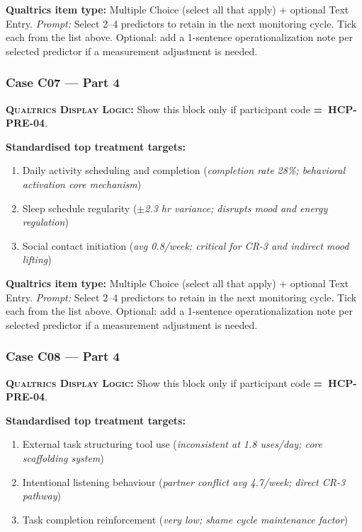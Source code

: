 \documentclass[11pt,a4paper]{article}
\newcommand{\checkboxresponse}[1]{\begin{tcolorbox}[colback=ResponseBG,colframe=GoldAmber,boxrule=0.6pt,arc=1.5mm,left=6pt,right=6pt,top=5pt,bottom=5pt]\small\textbf{\color{GoldAmber}Qualtrics item type:} Multiple Choice (select all that apply) + optional Text Entry. \quad \textit{Prompt:} #1\end{tcolorbox}}
\newcommand{\dlnote}[1]{\par\vspace{0.15em}\noindent\begin{tcolorbox}[colback=AccentAmber,colframe=GoldAmber,boxrule=0.45pt,arc=1mm,left=5pt,right=5pt,top=2.5pt,bottom=2.5pt]\footnotesize\textbf{\color{GoldAmber}\scshape Qualtrics Display Logic:} Show this block only if participant code \textbf{=~#1}.\end{tcolorbox}\vspace{0.1em}}
\begin{document}
\checkboxresponse{Select 2--4 predictors to retain in the next monitoring cycle. Tick each from the list above. Optional: add a 1-sentence operationalization note per selected predictor if a measurement adjustment is needed.}

\vspace{0.4em}

\subsubsection*{Case C07 --- Part 4}
\dlnote{HCP-PRE-04}

\begin{contextbox}
\small\textbf{Standardised top treatment targets:}
\begin{enumerate}[topsep=2pt,itemsep=1pt,label=\arabic*.]
\item Daily activity scheduling and completion (\textit{completion rate 28\%; behavioral activation core mechanism})
\item Sleep schedule regularity (\textit{$\pm$2.3 hr variance; disrupts mood and energy regulation})
\item Social contact initiation (\textit{avg 0.8/week; critical for CR-3 and indirect mood lifting})
\end{enumerate}
\end{contextbox}

\checkboxresponse{Select 2--4 predictors to retain in the next monitoring cycle. Tick each from the list above. Optional: add a 1-sentence operationalization note per selected predictor if a measurement adjustment is needed.}

\vspace{0.4em}

\subsubsection*{Case C08 --- Part 4}
\dlnote{HCP-PRE-04}

\begin{contextbox}
\small\textbf{Standardised top treatment targets:}
\begin{enumerate}[topsep=2pt,itemsep=1pt,label=\arabic*.]
\item External task structuring tool use (\textit{inconsistent at 1.8 uses/day; core scaffolding system})
\item Intentional listening behaviour (\textit{partner conflict avg 4.7/week; direct CR-3 pathway})
\item Task completion reinforcement (\textit{very low; shame cycle maintenance factor})
\end{enumerate}
\end{contextbox}
\end{document}
